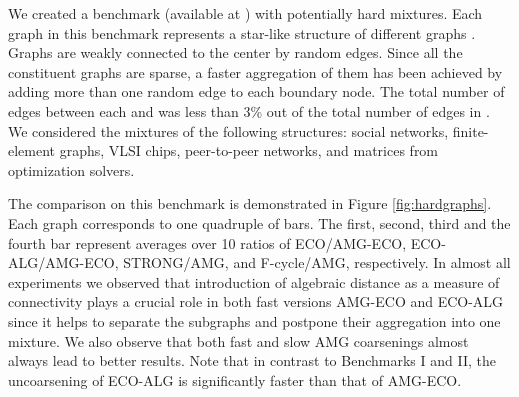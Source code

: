 \documentclass{llncs}
\begin{document}
\par We created a benchmark (available at \cite{dimacs10}) with potentially hard mixtures. Each graph in this benchmark represents a star-like structure of different graphs . Graphs  are weakly connected to the center  by random edges. Since all the constituent 
graphs are sparse, a faster aggregation of them has been achieved by adding more than one random edge to each boundary node. The total number of edges between each  and  was less than 3\% out of the total number of edges in . We considered the mixtures of the following structures: social networks, finite-element graphs, VLSI chips, peer-to-peer networks, and matrices from optimization solvers.
\par The comparison on this benchmark is demonstrated in Figure \ref{fig:hardgraphs}. Each graph corresponds to one quadruple of bars. The first, second, third and the fourth bar represent averages over 10 ratios of ECO/AMG-ECO, ECO-ALG/AMG-ECO, STRONG/AMG, and F-cycle/AMG, respectively. In almost all experiments we observed that introduction of algebraic distance as a measure of connectivity plays a crucial role in both fast versions AMG-ECO and ECO-ALG since it
helps to separate the subgraphs and postpone their aggregation into one mixture. We also observe that both fast and slow AMG coarsenings almost always lead to better results. Note that in contrast to Benchmarks I and  II, the uncoarsening of ECO-ALG is significantly faster than that of AMG-ECO. 
\end{document}
